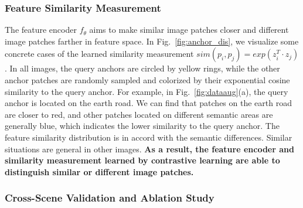 \documentclass[letterpaper, 10 pt, conference]{ieeeconf}  %
\begin{document}
	\subsubsection{Feature Similarity Measurement}
	The feature encoder $f_\theta$ aims to make similar image patches closer and different image patches farther in feature space.
	In Fig.~\ref{fig:anchor_dis}, we visualize some concrete cases of the learned similarity measurement $sim(p_i,p_j)=exp(z_i^T \cdot z_j)$. In all images, the query anchors are circled by yellow rings, while the other anchor patches are randomly sampled and colorized by their exponential cosine similarity to the query anchor. For example, in Fig.~\ref{fig:dataaug}(a), the query anchor is located on the earth road. We can find that patches on the earth road are closer to red, and other patches located on different semantic areas are generally blue, which indicates the lower similarity to the query anchor. The feature similarity distribution is in accord with the semantic differences. Similar situations are general in other images. \textbf{As a result, the feature encoder and similarity measurement learned by contrastive learning are able to distinguish similar or different image patches.}
	
	\subsubsection{Cross-Scene Validation and Ablation Study}
	
\end{document}
